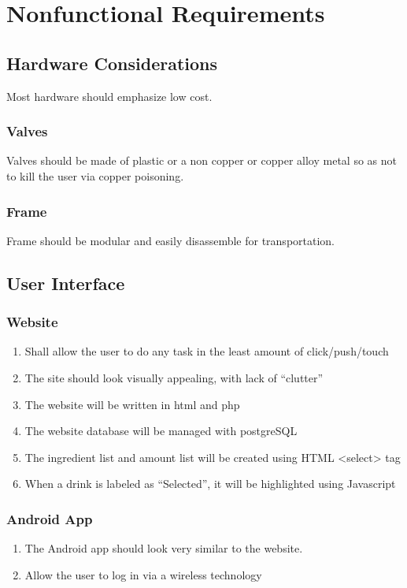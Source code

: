 \chapter{Nonfunctional Requirements}

{
    \renewcommand*{\theenumi}{\thesubsection.\arabic{enumi}}
    \renewcommand*{\theenumii}{\theenumi.\arabic{enumii}}
    \renewcommand*{\theenumiii}{\theenumii.\arabic{enumiii}}
    
    \section{Hardware Considerations}
	Most hardware should emphasize low cost.    
    
    \subsection{Valves}
    Valves should be made of plastic or a non copper or copper alloy metal so as not to kill the user via copper poisoning.
	\subsection{Frame}
    Frame should be modular and easily disassemble for transportation.

 	\section{User Interface}
 	
 	\subsection{Website}
 	\begin{enumerate}
    	\item Shall allow the user to do any task in the least amount of click/push/touch
   	 	\item The site should look visually appealing, with lack of ``clutter''
    	\item The website will be written in html and php
    	\item The website database will be managed with postgreSQL
    	\item The ingredient list and amount list will be created using HTML <select> tag
    	\item When a drink is labeled as ``Selected'', it will be highlighted using Javascript
    \end{enumerate}
    \subsection{Android App}
    \begin{enumerate}
    	\item The Android app should look very similar to the website.
   		\item Allow the user to log in via a wireless technology\
   	\end{enumerate}
}
